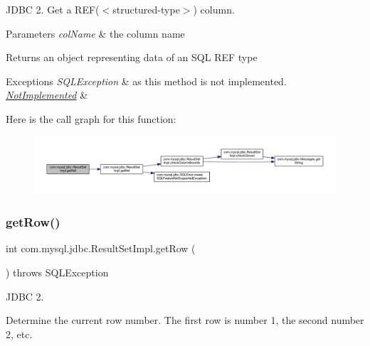 J\+D\+BC 2. Get a R\+EF($<$structured-\/type$>$) column.


\begin{DoxyParams}{Parameters}
{\em col\+Name} & the column name\\
\hline
\end{DoxyParams}
\begin{DoxyReturn}{Returns}
an object representing data of an S\+QL R\+EF type
\end{DoxyReturn}

\begin{DoxyExceptions}{Exceptions}
{\em S\+Q\+L\+Exception} & as this method is not implemented. \\
\hline
{\em \mbox{\hyperlink{classcom_1_1mysql_1_1jdbc_1_1_not_implemented}{Not\+Implemented}}} & \\
\hline
\end{DoxyExceptions}
Here is the call graph for this function\+:
\nopagebreak
\begin{figure}[H]
\begin{center}
\leavevmode
\includegraphics[width=350pt]{classcom_1_1mysql_1_1jdbc_1_1_result_set_impl_af8b105dab46bd80b9d201a544e993e68_cgraph}
\end{center}
\end{figure}
\mbox{\label{classcom_1_1mysql_1_1jdbc_1_1_result_set_impl_aeab5769a8f98deccc6ec77859c2c4d8f}} 
\subsubsection{\texorpdfstring{get\+Row()}{getRow()}}
{\footnotesize\ttfamily int com.\+mysql.\+jdbc.\+Result\+Set\+Impl.\+get\+Row (\begin{DoxyParamCaption}{ }\end{DoxyParamCaption}) throws S\+Q\+L\+Exception}

J\+D\+BC 2.

Determine the current row number. The first row is number 1, the second number 2, etc. 

